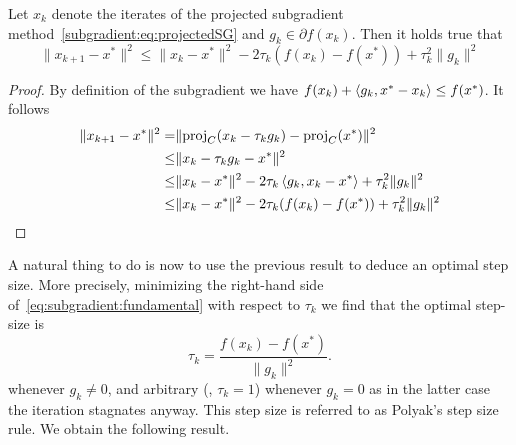 \begin{lemma}\label{lemma:subgradient:fundamental}
    Let $x_k$ denote the iterates of the projected subgradient method~\eqref{subgradient:eq:projectedSG} and $g_k\in\partial f(x_k)$. Then it holds true that 
    \begin{equation}
        \|x_{k+1}-x^*\|^2 
            \leq \|x_k- x^*\|^2 - 2\tau_k (f(x_k)-f(x^*)) + \tau_k^2\|g_k\|^2
    \end{equation}
\end{lemma}
\begin{proof}
    By definition of the subgradient we have $f(x_k)+ \left\langle g_k , x^*-x_k\right\rangle\leq f(x^*)$. It follows
    \begin{equation}\label{eq:subgradient:fundamental}
        \begin{aligned}
            \|x_{k+1}-x^*\|^2 
            =& \|\mathrm{proj}_C(x_k-\tau_kg_k) - \mathrm{proj}_C(x^*)\|^2\\
            \leq& \|x_k-\tau_k g_k - x^*\|^2\\
            \leq& \|x_k- x^*\|^2 - 2\tau_k \left\langle g_k , x_k-x^*\right\rangle + \tau_k^2\|g_k\|^2\\
            \leq& \|x_k- x^*\|^2 - 2\tau_k (f(x_k)-f(x^*)) + \tau_k^2\|g_k\|^2
        \end{aligned}
    \end{equation}
\end{proof}
A natural thing to do is now to use the previous result to deduce an optimal step size. More precisely, minimizing the right-hand side of~\eqref{eq:subgradient:fundamental} with respect to $\tau_k$ we find that the optimal step-size is
\begin{equation}
    \tau_k = \frac{f(x_k)-f(x^*)}{\|g_k\|^2}.
\end{equation}
whenever $g_k\neq 0$, and arbitrary (\eg, $\tau_k=1$) whenever $g_k=0$ as in the latter case the iteration stagnates anyway.
This step size is referred to as Polyak's step size rule. We obtain the following result.

